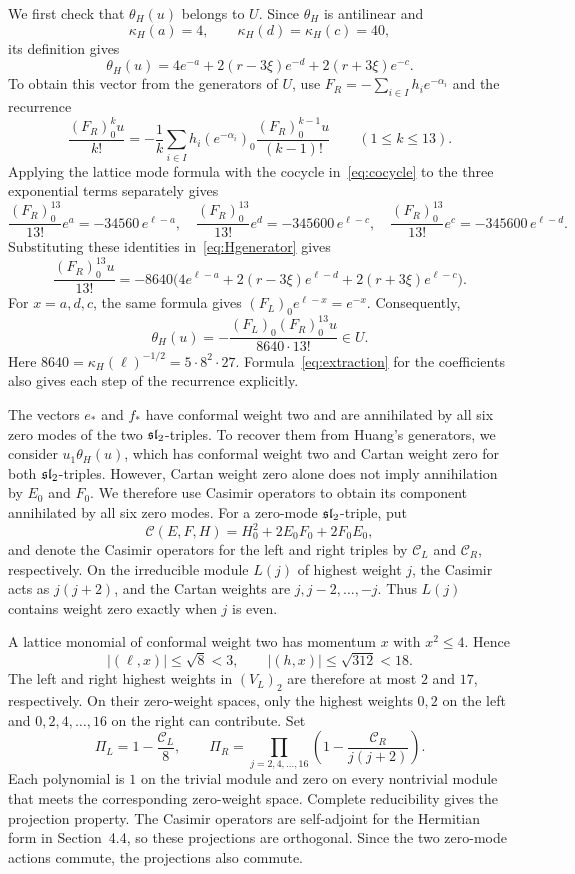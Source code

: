 \documentclass[11pt,reqno]{amsart}
\theoremstyle{definition}\newtheorem{definition}[theorem]{Definition}
\theoremstyle{remark}\newtheorem{remark}[theorem]{Remark}
\numberwithin{equation}{section}
\begin{document}
We first check that $\theta_H(u)$ belongs to $U$. Since $\theta_H$ is antilinear and
\[
 \kappa_H(a)=4,\qquad \kappa_H(d)=\kappa_H(c)=40,
\]
its definition gives
\[
 \theta_H(u)=4e^{-a}+2(r-3\xi)e^{-d}+2(r+3\xi)e^{-c}.
\]
To obtain this vector from the generators of $U$, use $F_R=-\sum_{i\in I}h_i e^{-\alpha_i}$ and the recurrence
\[
 \frac{(F_R)_0^ku}{k!}
 =-\frac1k\sum_{i\in I}h_i(e^{-\alpha_i})_0
       \frac{(F_R)_0^{k-1}u}{(k-1)!}
 \qquad(1\le k\le13).
\]
Applying the lattice mode formula with the cocycle in~\eqref{eq:cocycle} to the three exponential terms separately gives
\[
 \frac{(F_R)_0^{13}}{13!}e^a=-34560\,e^{\ell-a},\quad
 \frac{(F_R)_0^{13}}{13!}e^d=-345600\,e^{\ell-c},\quad
 \frac{(F_R)_0^{13}}{13!}e^c=-345600\,e^{\ell-d}.
\]
Substituting these identities in~\eqref{eq:Hgenerator} gives
\[
 \frac{(F_R)_0^{13}u}{13!}
 =-8640\bigl(4e^{\ell-a}+2(r-3\xi)e^{\ell-d}
                         +2(r+3\xi)e^{\ell-c}\bigr).
\]
For $x=a,d,c$, the same formula gives $(F_L)_0e^{\ell-x}=e^{-x}$. Consequently,
\[
 \theta_H(u)=-\frac{(F_L)_0(F_R)_0^{13}u}{8640\cdot13!}\in U.
\]
Here $8640=\kappa_H(\ell)^{-1/2}=5\cdot8^2\cdot27$. Formula~\eqref{eq:extraction} for the coefficients also gives each step of the recurrence explicitly.

The vectors $e_*$ and $f_*$ have conformal weight two and are annihilated by all six zero modes of the two $\mathfrak{sl}_2$-triples. To recover them from Huang's generators, we consider $u_1\theta_H(u)$, which has conformal weight two and Cartan weight zero for both $\mathfrak{sl}_2$-triples. However, Cartan weight zero alone does not imply annihilation by $E_0$ and $F_0$. We therefore use Casimir operators to obtain its component annihilated by all six zero modes. For a zero-mode $\mathfrak{sl}_2$-triple, put
\[
 \mathcal C(E,F,H)=H_0^2+2E_0F_0+2F_0E_0,
\]
and denote the Casimir operators for the left and right triples by $\mathcal C_L$ and $\mathcal C_R$, respectively. On the irreducible module $L(j)$ of highest weight $j$, the Casimir acts as $j(j+2)$, and the Cartan weights are $j,j-2,\ldots,-j$. Thus $L(j)$ contains weight zero exactly when $j$ is even.

A lattice monomial of conformal weight two has momentum $x$ with $x^2\le4$. Hence
\[
 |(\ell,x)|\le\sqrt8<3,\qquad |(h,x)|\le\sqrt{312}<18.
\]
The left and right highest weights in $(V_L)_2$ are therefore at most $2$ and $17$, respectively. On their zero-weight spaces, only the highest weights $0,2$ on the left and $0,2,4,\ldots,16$ on the right can contribute. Set
\begin{equation}\label{eq:casimirprojectors}
 \Pi_L=1-\frac{\mathcal C_L}{8},\qquad
 \Pi_R=\prod_{j=2,4,\ldots,16}\left(1-\frac{\mathcal C_R}{j(j+2)}\right).
\end{equation}
Each polynomial is $1$ on the trivial module and zero on every nontrivial module that meets the corresponding zero-weight space. Complete reducibility gives the projection property. The Casimir operators are self-adjoint for the Hermitian form in Section~4.4, so these projections are orthogonal. Since the two zero-mode actions commute, the projections also commute.
\end{document}
